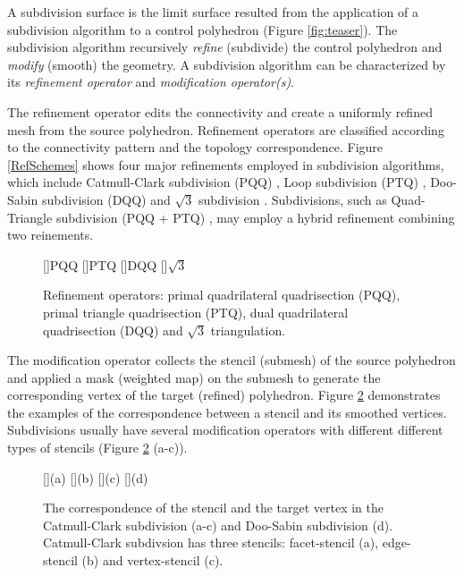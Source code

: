 A subdivision surface is the limit surface resulted from the
application of a subdivision algorithm to a control polyhedron
(Figure \ref{fig:teaser}). The subdivision algorithm  
recursively \emph{refine} (subdivide) the control polyhedron 
and \emph{modify} (smooth) the geometry. 
A subdivision algorithm can be characterized 
by its \emph{refinement operator} and 
\emph{modification operator(s)}. 

The refinement operator edits the connectivity
and create a uniformly refined mesh from the source polyhedron.
Refinement operators are classified according to the connectivity
pattern and the topology correspondence. 
Figure \ref{RefSchemes} shows four major refinements employed
in subdivision algorithms, which include 
Catmull-Clark subdivision (PQQ) \cite{cc},
Loop subdivision (PTQ) \cite{loop}, 
Doo-Sabin subdivision (DQQ) \cite{ds}
and $\sqrt{3}$ subdivision \cite{sqrt3}.
Subdivisions, such as Quad-Triangle subdivision (PQQ + PTQ) \cite{sqt},
may employ a hybrid refinement combining two reinements.

\begin{figure}
  \centering
  []{\scriptsize PQQ} 
  []{\scriptsize PTQ}
  []{\scriptsize DQQ} 
  []{\scriptsize $\sqrt{3}$} 
  \caption{Refinement operators: 
    primal quadrilateral quadrisection (PQQ),
    primal triangle quadrisection (PTQ),
    dual quadrilateral quadrisection (DQQ) and
    $\sqrt{3}$ triangulation.}
  \label{fig:RefSchemes}
\end{figure}

The modification operator collects the stencil (submesh) of 
the source polyhedron and applied a mask (weighted map) 
on the submesh to generate the corresponding vertex of 
the target (refined) polyhedron. Figure \ref{fig:RefMap} 
demonstrates the examples of the correspondence 
between a stencil and its smoothed vertices. Subdivisions
usually have several modification operators with different
different types of stencils (Figure \ref{fig:RefMap} (a-c)). 

\begin{figure}
  \centering
  []{(a)}
  []{(b)}
  []{(c)}
  []{(d)}
  \caption{The correspondence of the stencil and the 
           target vertex in the Catmull-Clark subdivision (a-c)
	   and Doo-Sabin subdivision (d). Catmull-Clark
	   subdivsion has three stencils: facet-stencil (a), 
	   edge-stencil (b) and vertex-stencil (c).}
  \label{fig:RefMap}
\end{figure}

